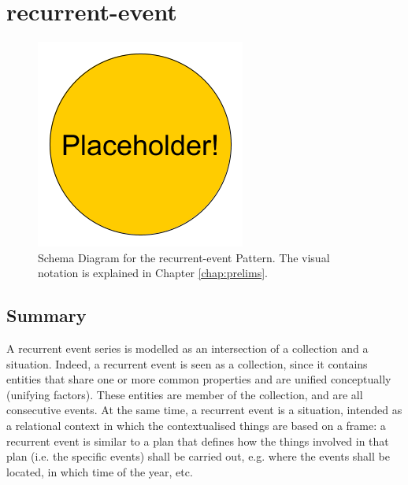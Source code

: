 \section{recurrent-event}
\label{sec:recurrent-event}
\begin{figure}[h!]
\begin{center}
\includegraphics[width=.8\textwidth]{figures/placeholder}
\end{center}
\caption{Schema Diagram for the recurrent-event Pattern. The visual notation is explained in Chapter \ref{chap:prelims}.}
\label{fig:recurrent-event}
\end{figure}
\subsection{Summary}
\label{sum:recurrent-event}
A recurrent event series is modelled as an intersection of a collection and a situation. Indeed, a recurrent event is seen as a collection, since it contains entities that share one or more common properties and are unified conceptually (unifying factors). These entities are member of the collection, and are all consecutive events. At the same time, a recurrent event is a situation, intended as a relational context in which the contextualised things are based on a frame: a recurrent event is similar to a plan that defines how the things involved in that plan (i.e. the specific events) shall be carried out, e.g. where the events shall be located, in which time of the year, etc.

